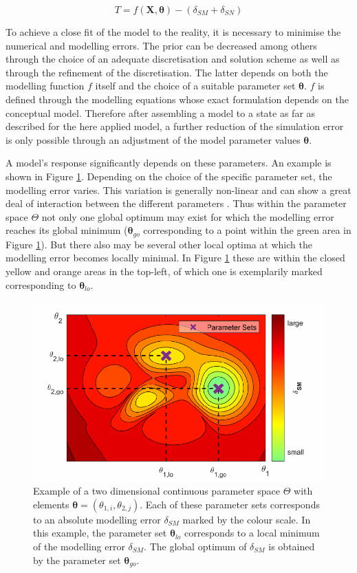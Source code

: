 \begin{equation}
    \label{Eq-CompSimTruth}
    T = f(\bm{X},\bm{\theta}) - (\delta_{SM} + \delta_{SN})
\end{equation}

To achieve a close fit of the model to the reality, it is necessary to minimise the numerical and modelling errors. The prior can be decreased among others through the choice of an adequate discretisation and solution scheme as well as through the refinement of the discretisation. The latter depends on both the modelling function $f$ itself and the choice of a suitable parameter set $\bm{\theta}$. $f$ is defined through the modelling equations whose exact formulation depends on the conceptual model. Therefore after assembling a model to a state as far as described for the here applied model, a further reduction of the simulation error is only possible through an adjustment of the model parameter values $\bm{\theta}$.

A model's response significantly depends on these parameters. An example is shown in Figure \ref{Fig-ParamSpaceEx}. Depending on the choice of the specific parameter set, the modelling error varies. This variation is generally non-linear and can show a great deal of interaction between the different parameters \parencite{Duan.1993}. Thus within the parameter space $\Theta$ not only one global optimum may exist for which the modelling error reaches its global minimum ($\bm{\theta}_{go}$ corresponding to a point within the green area in Figure \ref{Fig-ParamSpaceEx}). But there also may be several other local optima at which the modelling error becomes locally minimal. In Figure \ref{Fig-ParamSpaceEx} these are within the closed yellow and orange areas in the top-left, of which one is exemplarily marked corresponding to $\bm{\theta}_{lo}$.

\begin{figure}[h]
    \centering
    \includegraphics{./img/Fig-ParamSpaceEx.pdf}
    \caption{Example of a two dimensional continuous parameter space $\Theta$ with elements $\bm{\theta} = \left(\theta_{1,i}, \theta_{2,j}\right)$. Each of these parameter sets corresponds to an absolute modelling error $\delta_{SM}$ marked by the colour scale. In this example, the parameter set $\bm{\theta}_{lo}$ corresponds to a local minimum of the modelling error $\delta_{SM}$. The global optimum of $\delta_{SM}$ is obtained by the parameter set $\bm{\theta}_{go}$.}
    \label{Fig-ParamSpaceEx}
\end{figure}

